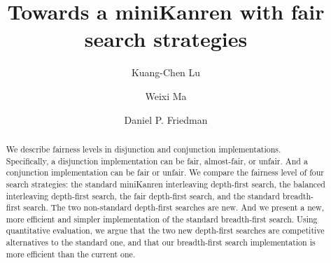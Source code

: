 \documentclass[format=acmlarge, review=true, authordraft=true]{acmart}
\title{Towards a miniKanren with fair search strategies}
\author{Kuang-Chen Lu}
\affiliation{Indiana University}
\author{Weixi Ma}
\affiliation{Indiana University}
\author{Daniel P. Friedman}
\affiliation{Indiana University}
\newcommand{\conde}{\texttt{cond$^e$}}
\newcommand{\conj}{\texttt{conj}}
\newcommand{\disj}{\texttt{disj}}
\newcommand{\DFSi }[0]{DFS$_\textrm{i}$}
\newcommand{\DFSf }[0]{DFS$_\textrm{f}$}
\newcommand{\DFSbi}[0]{DFS$_\textrm{bi}$}
\newcommand{\BFSser}[0]{BFS$_\textrm{ser}$}
\begin{document}

\begin{abstract}

We describe fairness levels in disjunction and conjunction
implementations.  Specifically, a disjunction implementation can be
fair, almost-fair, or unfair. And a conjunction implementation can
be fair or unfair.  We compare the fairness level of four search
strategies: the standard miniKanren interleaving depth-first search,
the balanced interleaving depth-first search, the fair depth-first
search, and the standard breadth-first search.
The two non-standard depth-first searches are new. And we present a new, more 
efficient and simpler implementation of the standard breadth-first search. Using 
quantitative evaluation, we argue that the two new depth-first searches are 
competitive alternatives to the standard one, 
and that our breadth-first search implementation is more efficient than 
the current one.


% 

\end{abstract}
\end{document}
